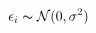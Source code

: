 \documentclass[preview]{standalone}
\begin{document}
\begin{align*}
\epsilon_i \thicksim \mathcal{N}(0,\sigma^2)
\end{align*}
\end{document}
